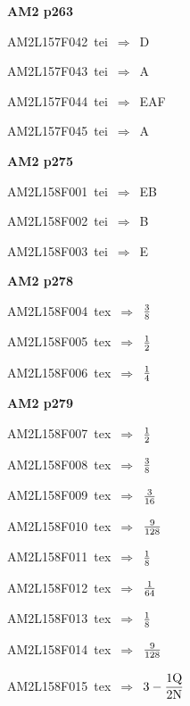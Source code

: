 \par\vfill\eject
{\bf\hfill AM2 p263\hfill\hbox{}}\par\bigskip
{\sixrm AM2L157F042\ {\sixit tei}\ }$\Rightarrow$\ D\par\smallskip
{\sixrm AM2L157F043\ {\sixit tei}\ }$\Rightarrow$\ A\par\smallskip
{\sixrm AM2L157F044\ {\sixit tei}\ }$\Rightarrow$\ EAF\par\smallskip
{\sixrm AM2L157F045\ {\sixit tei}\ }$\Rightarrow$\ A\par\smallskip

\par\vfill\eject
{\bf\hfill AM2 p275\hfill\hbox{}}\par\bigskip
{\sixrm AM2L158F001\ {\sixit tei}\ }$\Rightarrow$\ EB\par\smallskip
{\sixrm AM2L158F002\ {\sixit tei}\ }$\Rightarrow$\ B\par\smallskip
{\sixrm AM2L158F003\ {\sixit tei}\ }$\Rightarrow$\ E\par\smallskip

\par\vfill\eject
{\bf\hfill AM2 p278\hfill\hbox{}}\par\bigskip
{\sixrm AM2L158F004\ {\sixit tex}\ }$\Rightarrow$\ ${3\over 8}$\par\smallskip
{\sixrm AM2L158F005\ {\sixit tex}\ }$\Rightarrow$\ ${1\over 2}$\par\smallskip
{\sixrm AM2L158F006\ {\sixit tex}\ }$\Rightarrow$\ ${1\over 4}$\par\smallskip

\par\vfill\eject
{\bf\hfill AM2 p279\hfill\hbox{}}\par\bigskip
{\sixrm AM2L158F007\ {\sixit tex}\ }$\Rightarrow$\ ${1\over 2}$\par\smallskip
{\sixrm AM2L158F008\ {\sixit tex}\ }$\Rightarrow$\ ${3\over 8}$\par\smallskip
{\sixrm AM2L158F009\ {\sixit tex}\ }$\Rightarrow$\ ${3\over 16}$\par\smallskip
{\sixrm AM2L158F010\ {\sixit tex}\ }$\Rightarrow$\ ${9\over 128}$\par\smallskip
{\sixrm AM2L158F011\ {\sixit tex}\ }$\Rightarrow$\ ${1\over 8}$\par\smallskip
{\sixrm AM2L158F012\ {\sixit tex}\ }$\Rightarrow$\ ${1\over 64}$\par\smallskip
{\sixrm AM2L158F013\ {\sixit tex}\ }$\Rightarrow$\ ${1\over 8}$\par\smallskip
{\sixrm AM2L158F014\ {\sixit tex}\ }$\Rightarrow$\ ${9\over 128}$\par\smallskip
{\sixrm AM2L158F015\ {\sixit tex}\ }$\Rightarrow$\ $3 - {\displaystyle\strut 1{\rm Q}\over \displaystyle\strut 2{\rm N}}$\par\smallskip

